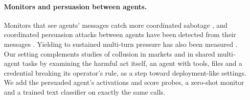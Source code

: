 \paragraph{Monitors and persuasion between agents.}
Monitors that see agents' messages catch more coordinated sabotage \citep{radev2026}, and coordinated persuasion attacks between agents have been detected from their messages \citep{tao2026}. Yielding to sustained multi-turn pressure has also been measured \citep{tang2026}.
Our setting complements studies of collusion in markets and in shared multi-agent tasks \citep{fish2026,lin2025,nakamura2026} by examining the harmful act itself, an agent with tools, files and a credential breaking its operator's rule, as a step toward deployment-like settings.
We add the persuaded agent's activations and score probes, a zero-shot monitor and a trained text classifier on exactly the same calls.
